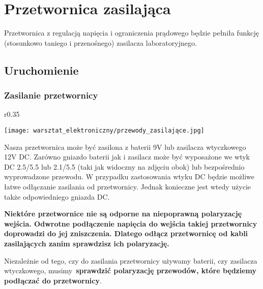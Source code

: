 \documentclass{pdfBooklets}
\begin{document}
\section{Przetwornica zasilająca}

Przetwornica z regulacją napięcia i ograniczenia prądowego będzie pełniła funkcję (stosunkowo taniego i przenośnego) zasilacza laboratoryjnego.

\subsection{Uruchomienie}
\subsubsection{Zasilanie przetwornicy}

\begin{wrapfigure}{r}{0.35\textwidth}
  \begin{center}
    \vspace{-40pt}
    \texttt{[image: warsztat\_elektroniczny/przewody\_zasilające.jpg]}
    \vspace{-40pt}
  \end{center}
\end{wrapfigure}


Nasza przetwornica może być zasilona z baterii 9V lub zasilacza wtyczkowego 12V DC.
Zarówno gniazdo baterii jak i zasilacz może być wyposażone we wtyk DC 2.5/5.5 lub 2.1/5.5 (taki jak widoczny na zdjęciu obok) lub bezpośrednio wyprowadzone przewodu.
W przypadku zastosowania wtyku DC będzie możliwe łatwe odłączanie zasilania od przetwornicy. Jednak konieczne jest wtedy użycie także odpowiedniego gniazda DC.

\begin{ProTip}{}
  \textbf{Niektóre przetwornice nie są odporne na niepoprawną polaryzację wejścia. Odwrotne podłączenie napięcia do wejścia takiej przetwornicy doprowadzi do jej zniszczenia. Dlatego odłącz przetwornicę od kabli zasilających zanim sprawdzisz ich polaryzację.}
\end{ProTip}

\vspace{13pt}\noindent
Niezależnie od tego, czy do zasilania przetwornicy używamy baterii, czy zasilacza wtyczkowego, musimy~\textbf{sprawdzić
  polaryzację przewodów, które będziemy podłączać do przetwornicy}. 
\\
\end{document}
